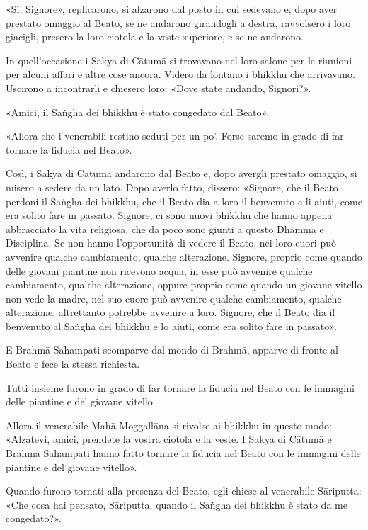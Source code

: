 «Sì, Signore», replicarono, si alzarono dal posto in cui sedevano e, dopo aver
prestato omaggio al Beato, se ne andarono girandogli a destra, ravvolsero i loro
giacigli, presero la loro ciotola e la veste superiore, e se ne andarono.

In quell’occasione i Sakya di Cātumā si trovavano nel loro salone per le
riunioni per alcuni affari e altre cose ancora. Videro da lontano i bhikkhu che
arrivavano. Uscirono a incontrarli e chiesero loro: «Dove state andando,
Signori?».

«Amici, il Saṅgha dei bhikkhu è stato congedato dal Beato».

«Allora che i venerabili restino seduti per un po’. Forse saremo in grado di far
tornare la fiducia nel Beato».

Così, i Sakya di Cātumā andarono dal Beato e, dopo avergli prestato omaggio, si
misero a sedere da un lato. Dopo averlo fatto, dissero: «Signore, che il Beato
perdoni il Saṅgha dei bhikkhu, che il Beato dia a loro il benvenuto e li aiuti,
come era solito fare in passato. Signore, ci sono nuovi bhikkhu che hanno appena
abbracciato la vita religiosa, che da poco sono giunti a questo Dhamma e
Disciplina. Se non hanno l’opportunità di vedere il Beato, nei loro cuori può
avvenire qualche cambiamento, qualche alterazione. Signore, proprio come quando
delle giovani piantine non ricevono acqua, in esse può avvenire qualche
cambiamento, qualche alterazione, oppure proprio come quando un giovane vitello
non vede la madre, nel suo cuore può avvenire qualche cambiamento, qualche
alterazione, altrettanto potrebbe avvenire a loro. Signore, che il Beato dia il
benvenuto al Saṅgha dei bhikkhu e lo aiuti, come era solito fare in passato».

E Brahmā Sahampati scomparve dal mondo di Brahmā, apparve di fronte al Beato e
fece la stessa richiesta.

Tutti insieme furono in grado di far tornare la fiducia nel Beato con le
immagini delle piantine e del giovane vitello.

Allora il venerabile Mahā-Moggallāna si rivolse ai bhikkhu in questo modo:
«Alzatevi, amici, prendete la vostra ciotola e la veste. I Sakya di Cātumā e
Brahmā Sahampati hanno fatto tornare la fiducia nel Beato con le immagini delle
piantine e del giovane vitello».

Quando furono tornati alla presenza del Beato, egli chiese al venerabile
Sāriputta: «Che cosa hai pensato, Sāriputta, quando il Saṅgha dei bhikkhu è
stato da me congedato?».


